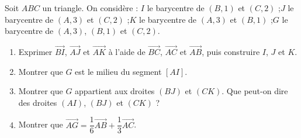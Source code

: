
\newcommand{\R}{\mathbb{R}}
\newcommand{\vect}[1]{\overrightarrow{#1}}

Soit $ABC$ un triangle. On considère :
$I$ le barycentre de $(B,1)$ et $(C,2)$ ;\quad $J$ le barycentre de $(A,3)$ et $(C,2)$ ;\quad $K$ le barycentre de $(A,3)$ et $(B,1)$ ;\quad $G$ le barycentre de $(A,3)$, $(B,1)$ et $(C,2)$.
\begin{center}
\end{center}
\begin{enumerate}
  \item Exprimer $\vect{BI}$, $\vect{AJ}$ et $\vect{AK}$ à l'aide de $\vect{BC}$, $\vect{AC}$ et $\vect{AB}$, puis construire $I$, $J$ et $K$.
  \item Montrer que $G$ est le milieu du segment $[AI]$.
  \item Montrer que $G$ appartient aux droites $(BJ)$ et $(CK)$. Que peut-on dire des droites $(AI)$, $(BJ)$ et $(CK)$ ?
  \item Montrer que $\vect{AG}=\dfrac16\vect{AB}+\dfrac13\vect{AC}$.
\end{enumerate}

